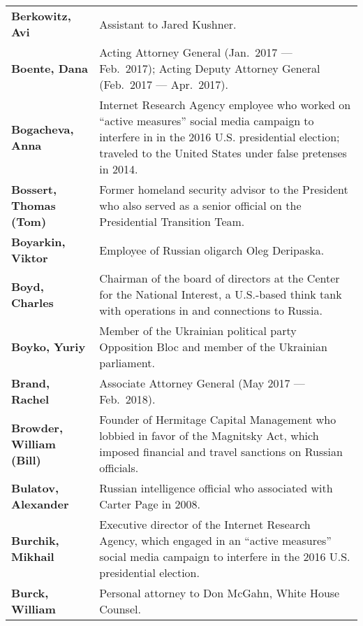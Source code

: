 \begin{longtable}{ p{} p{} }
    \textbf{Berkowitz, Avi} & Assistant to Jared Kushner. \\

    \textbf{Boente, Dana} & Acting Attorney General (Jan.~2017 — Feb.~2017); Acting Deputy Attorney General (Feb.~2017 — Apr.~2017). \\

    \textbf{Bogacheva, Anna} & Internet Research Agency employee who worked on ``active measures'' social media campaign to interfere in in the 2016 U.S. presidential election; traveled to the United States under false pretenses in 2014. \\

    \textbf{Bossert, Thomas (Tom)} & Former homeland security advisor to the President who also served as a senior official on the Presidential Transition Team. \\

    \textbf{Boyarkin, Viktor} & Employee of Russian oligarch Oleg Deripaska. \\

    \textbf{Boyd, Charles} & Chairman of the board of directors at the Center for the National Interest, a U.S.-based think tank with operations in and connections to Russia. \\

    \textbf{Boyko, Yuriy} & Member of the Ukrainian political party Opposition Bloc and member of the Ukrainian parliament. \\

    \textbf{Brand, Rachel} & Associate Attorney General (May 2017 — Feb.~2018). \\

    \textbf{Browder, William (Bill)} & Founder of Hermitage Capital Management who lobbied in favor of the Magnitsky Act, which imposed financial and travel sanctions on Russian officials. \\

    \textbf{Bulatov, Alexander} & Russian intelligence official who associated with Carter Page in 2008. \\

    \textbf{Burchik, Mikhail} & Executive director of the Internet Research Agency, which engaged in an ``active measures'' social media campaign to interfere in the 2016 U.S. presidential election. \\

    \textbf{Burck, William} & Personal attorney to Don McGahn, White House Counsel. \\


\end{longtable}
